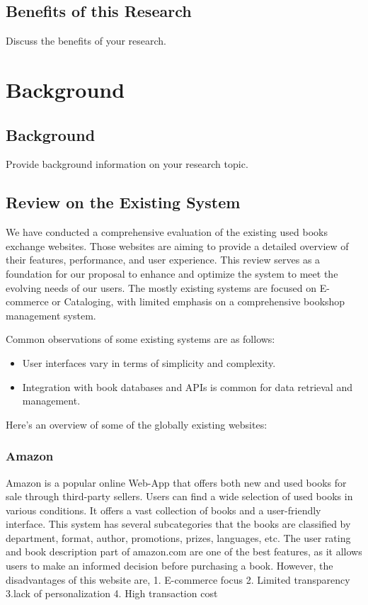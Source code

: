 \documentclass{article}
\begin{document}
\newpage
\subsection{Benefits of this Research}
Discuss the benefits of your research.

\newpage
\section{Background}
\subsection{Background}
Provide background information on your research topic.

\newpage
\subsection{Review on the Existing System}
We have conducted a comprehensive evaluation of the existing used books exchange websites. Those websites are aiming to provide a detailed overview of their features, performance, and user experience. This review serves as a foundation for our proposal to enhance and optimize the system to meet the evolving needs of our users. The mostly existing systems are focused on E-commerce or Cataloging, with limited emphasis on a comprehensive bookshop management system.

Common observations of some existing systems are as follows:
\begin{itemize}
    \item User interfaces vary in terms of simplicity and complexity.
    \item Integration with book databases and APIs is common for data retrieval and management.
\end{itemize}

Here's an overview of some of the globally existing websites:

\subsubsection{Amazon}
Amazon is a popular online Web-App that offers both new and used books for sale through third-party sellers. Users can find a wide selection of used books in various conditions. It offers a vast collection of books and a user-friendly interface. This system has several subcategories that the books are classified by department, format, author, promotions, prizes, languages, etc. The user rating and book description part of amazon.com are one of the best features, as it allows users to make an informed decision before purchasing a book. 
However, the disadvantages of this website are,
1. E-commerce focus
2. Limited transparency
3.lack of personalization
4. High transaction cost
\end{document}
